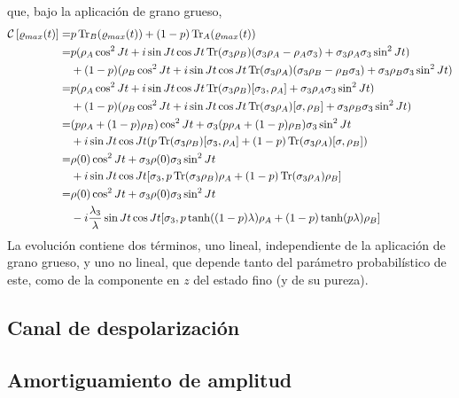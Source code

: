 que, bajo la aplicación de grano grueso,
\begin{align*}
    \mathcal{C}\left[\varrho_{max}(t)\right]=&p\Tr_{B}(\varrho_{max}(t))+(1-p)\Tr_{A}(\varrho_{max}(t))\\
    =&p(\rho_{A}\cos^{2}{Jt}+i\sin{Jt}\cos{Jt}\Tr(\sigma_{3} \rho_{B})(\sigma_{3}\rho_{A}- \rho_{A}\sigma_{3})+\sigma_{3}\rho_{A}\sigma_{3}\sin^{2}{Jt})\\
    &+(1-p)(\rho_{B}\cos^{2}{Jt}+i\sin{Jt}\cos{Jt}\Tr(\sigma_{3} \rho_{A})(\sigma_{3}\rho_{B}- \rho_{B}\sigma_{3})+\sigma_{3}\rho_{B}\sigma_{3}\sin^{2}{Jt})\\
    =&p(\rho_{A}\cos^{2}{Jt}+i\sin{Jt}\cos{Jt}\Tr(\sigma_{3} \rho_{B})[\sigma_{3},\rho_{A}]+\sigma_{3}\rho_{A}\sigma_{3}\sin^{2}{Jt})\\
    &+(1-p)(\rho_{B}\cos^{2}{Jt}+i\sin{Jt}\cos{Jt}\Tr(\sigma_{3} \rho_{A})[\sigma,\rho_{B}]+\sigma_{3}\rho_{B}\sigma_{3}\sin^{2}{Jt})\\
    =&(p\rho_{A}+(1-p)\rho_{B})\cos^{2}{Jt}+\sigma_{3}(p\rho_{A}+(1-p)\rho_{B})\sigma_{3}\sin^{2}{Jt}\\
    &+i\sin{Jt}\cos{Jt}(p\Tr(\sigma_{3} \rho_{B})[\sigma_{3},\rho_{A}]+(1-p)\Tr(\sigma_{3} \rho_{A})[\sigma,\rho_{B}])\\
    =&\rho(0)\cos^{2}{Jt}+\sigma_{3}\rho(0)\sigma_{3}\sin^{2}{Jt}\\
    &+i\sin{Jt}\cos{Jt}[\sigma_{3},p\Tr(\sigma_{3} \rho_{B})\rho_{A}+(1-p)\Tr(\sigma_{3} \rho_{A})\rho_{B}]\\
    =&\rho(0)\cos^{2}{Jt}+\sigma_{3}\rho(0)\sigma_{3}\sin^{2}{Jt}\\
    &-i\frac{\lambda_{3}}{\lambda}\sin{Jt}\cos{Jt}[\sigma_{3},p\tanh((1-p)\lambda)\rho_{A}+(1-p)\tanh(p\lambda)\rho_{B}]
\end{align*}	
La evolución contiene dos términos, uno lineal, independiente de la aplicación de grano grueso, y uno no lineal, que depende tanto del parámetro probabilístico de este, como de la componente en $z$ del estado fino (y de su pureza).  

\subsection{Canal de despolarización}

\subsection{Amortiguamiento de amplitud}